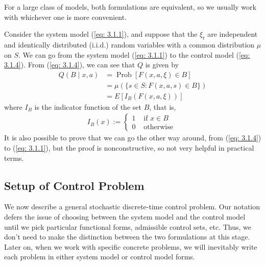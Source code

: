 \documentclass[\topdir/lecture\_notes.tex]{subfiles}
\begin{document}
For a large class of models, both formulations are equivalent, so we usually work with whichever one is more convenient.

\begin{example}\label{ex: 3.1}
Consider the system model (\ref{eq: 3.1.1}), and suppose that the $\xi_{t}$ are independent and identically distributed (i.i.d.) random variables with a common distribution $\mu$ on $S$. We can go from the system model (\ref{eq: 3.1.1}) to the control model (\ref{eq: 3.1.4}). From (\ref{eq: 3.1.4}), we can see that $Q$ is given by
\begin{align*}
Q(B \mid x, a) & =\operatorname{Prob}[F(x, a, \xi) \in B] \\
& =\mu(\{s \in S: F(x, a, s) \in B\}) \\
& =E[I_{B}(F(x, a, \xi))]
\end{align*}
where $I_{B}$ is the indicator function of the set $B$, that is,
\begin{align*}
I_{B}(x):= \begin{cases}
    1 & \text { if } x \in B \\ 
    0 & \text { otherwise }
    \end{cases}
\end{align*}
It is also possible to prove that we can go the other way around, from (\ref{eq: 3.1.4}) to (\ref{eq: 3.1.1}), but the proof is nonconstructive, so not very helpful in practical terms.
\end{example}

\subsection{Setup of Control Problem}
We now describe a general stochastic discrete-time control problem. Our notation defers the issue of choosing between the system model and the control model until we pick particular functional forms, admissible control sets, etc. Thus, we don't need to make the distinction between the two formulations at this stage. Later on, when we work with specific concrete problems, we will inevitably write each problem in either system model or control model forms.
\end{document}
